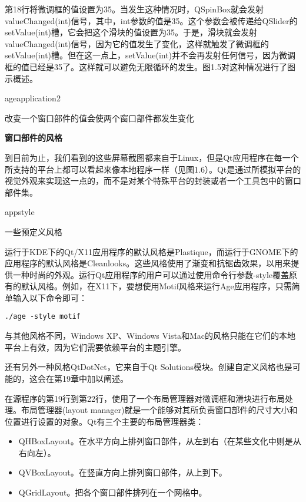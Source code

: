 \documentclass[11pt,oneside]{book}
\begin{document}
\begin{common-format}
第18行将微调框的值设置为35。当发生这种情况时，QSpinBox就会发射valueChanged(int)信号，其中，int参数的值是35。这个参数会被传递给QSlider的setValue(int)槽，它会把这个滑块的值设置为35。于是，滑块就会发射valueChanged(int)信号，因为它的值发生了变化，这样就触发了微调框的setValue(int)槽。但在这一点上，setValue(int)并不会再发射任何信号，因为微调框的值已经是35了。这样就可以避免无限循环的发生。图1.5对这种情况进行了图示概述。
\begin{fig}[0.8]{ageapplication2}
\caption{改变一个窗口部件的值会使两个窗口部件都发生变化}
\label{fig:ageapplication2}
\end{fig}


\begin{framed}
\vspace{-\parskip}
\begin{center}
\textbf{窗口部件的风格}
\end{center}

到目前为止，我们看到的这些屏幕截图都来自于Linux，但是Qt应用程序在每一个所支持的平台上都可以看起来像本地程序一样（见图1.6）。Qt是通过所模拟平台的视觉外观来实现这一点的，而不是对某个特殊平台的封装或者一个工具包中的窗口部件集。

\begin{linefig}[0.9]{appstyle}
\caption{一些预定义风格}
\label{fig:appstyle}
\end{linefig}

运行于KDE下的Qt/X11应用程序的默认风格是Plastique，而运行于GNOME下的应用程序的默认风格是Cleanlooks。这些风格使用了渐变和抗锯齿效果，以用来提供一种时尚的外观。运行Qt应用程序的用户可以通过使用命令行参数-style覆盖原有的默认风格。例如，在X11下，要想使用Motif风格来运行Age应用程序，只需简单输入以下命令即可：
\begin{Verbatim}
./age -style motif
\end{Verbatim}

与其他风格不同，Windows XP、Windows Vista和Mac的风格只能在它们的本地平台上有效，因为它们需要依赖平台的主题引擎。

还有另外一种风格QtDotNet，它来自于Qt Solutions模块。创建自定义风格也是可能的，这会在第19章中加以阐述。
\end{framed}

在源程序的第19行到第22行，使用了一个布局管理器对微调框和滑块进行布局处理。布局管理器(layout manager)就是一个能够对其所负责窗口部件的尺寸大小和位置进行设置的对象。Qt有三个主要的布局管理器类：
\begin{itemize}
\item QHBoxLayout。在水平方向上排列窗口部件，从左到右（在某些文化中则是从右向左）。
\item QVBoxLayout。在竖直方向上排列窗口部件，从上到下。
\item QGridLayout。把各个窗口部件排列在一个网格中。
\end{itemize}


\end{common-format}
\end{document}
